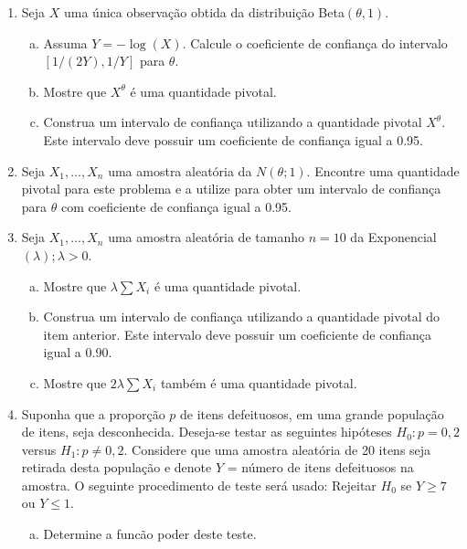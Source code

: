 \documentclass[10pt,brazil,addpoints]{exam}
\begin{document}
\begin{enumerate}[1.]

\item Seja $X$ uma única observação obtida da distribuição Beta$(\theta,1)$.

\begin{enumerate}[a)]
\item Assuma $Y = -\log(X)$. Calcule o coeficiente de confiança do intervalo $[1/(2Y), 1/Y]$ para $\theta$. 
\item Mostre que $X^{\theta}$ é uma quantidade pivotal.
\item Construa um intervalo de confiança utilizando a quantidade pivotal $X^{\theta}$. Este intervalo deve
possuir um coeficiente de confiança igual a 0.95.
\end{enumerate}

\item Seja $X_1, \ldots, X_n$ uma amostra aleatória da $N(\theta; 1)$. Encontre uma quantidade pivotal para este problema e a utilize para obter um intervalo de confiança para $\theta$ com coeficiente de confiança igual a 0.95.

\item Seja $X_1, \ldots, X_n$ uma amostra aleatória de tamanho $n = 10$ da Exponencial$(\lambda); \lambda > 0$.

\begin{enumerate}[a)]
\item Mostre que $\lambda\sum X_i$ é uma quantidade pivotal.
\item Construa um intervalo de confiança utilizando a quantidade pivotal do item anterior. Este intervalo deve possuir um coeficiente de confiança igual a 0.90.
\item Mostre que $2\lambda\sum X_i$ também é uma quantidade pivotal.
\end{enumerate}


\item Suponha que a proporção $p$ de itens defeituosos, em uma grande população de itens, seja desconhecida. Deseja-se testar as seguintes hipóteses $H_0 : p = 0,2$ versus $H_1 : p \neq 0,2$. Considere que uma amostra aleatória de 20 itens seja retirada desta população e denote $Y$ = número de itens defeituosos na amostra. O seguinte procedimento de teste será usado: Rejeitar $H_0$ se $Y \geq 7$ ou $Y \leq 1$.

\begin{enumerate}[a)]
\item Determine a funcão poder deste teste.
 

\end{enumerate}
\end{enumerate}
\end{document}
